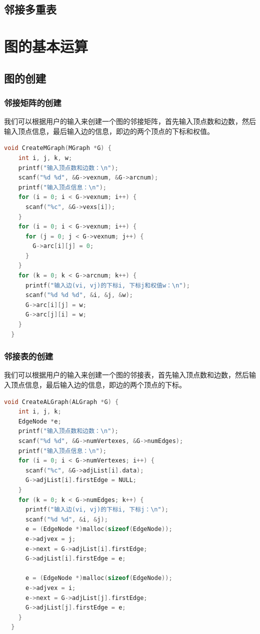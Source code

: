 \documentclass[lang=cn,newtx,10pt,scheme=chinese]{../elegantbook}
\begin{document}
\subsection{邻接多重表}

\section{图的基本运算}


\subsection{图的创建}

\subsubsection{邻接矩阵的创建}

我们可以根据用户的输入来创建一个图的邻接矩阵，首先输入顶点数和边数，然后输入顶点信息，最后输入边的信息，即边的两个顶点的下标和权值。

\begin{lstlisting}[language=C++, caption={邻接矩阵的创建}]
  void CreateMGraph(MGraph *G) {
    int i, j, k, w;
    printf("输入顶点数和边数：\n");
    scanf("%d %d", &G->vexnum, &G->arcnum);
    printf("输入顶点信息：\n");
    for (i = 0; i < G->vexnum; i++) {
      scanf("%c", &G->vexs[i]);
    }
    for (i = 0; i < G->vexnum; i++) {
      for (j = 0; j < G->vexnum; j++) {
        G->arc[i][j] = 0;
      }
    }
    for (k = 0; k < G->arcnum; k++) {
      printf("输入边(vi, vj)的下标i, 下标j和权值w：\n");
      scanf("%d %d %d", &i, &j, &w);
      G->arc[i][j] = w;
      G->arc[j][i] = w;
    }
  }
\end{lstlisting}

\subsubsection{邻接表的创建}

我们可以根据用户的输入来创建一个图的邻接表，首先输入顶点数和边数，然后输入顶点信息，最后输入边的信息，即边的两个顶点的下标。
\begin{lstlisting}[language=C++, caption={邻接表的创建}]
  void CreateALGraph(ALGraph *G) {
    int i, j, k;
    EdgeNode *e;
    printf("输入顶点数和边数：\n");
    scanf("%d %d", &G->numVertexes, &G->numEdges);
    printf("输入顶点信息：\n");
    for (i = 0; i < G->numVertexes; i++) {
      scanf("%c", &G->adjList[i].data);
      G->adjList[i].firstEdge = NULL;
    }
    for (k = 0; k < G->numEdges; k++) {
      printf("输入边(vi, vj)的下标i, 下标j：\n");
      scanf("%d %d", &i, &j);
      e = (EdgeNode *)malloc(sizeof(EdgeNode));
      e->adjvex = j;
      e->next = G->adjList[i].firstEdge;
      G->adjList[i].firstEdge = e;

      e = (EdgeNode *)malloc(sizeof(EdgeNode));
      e->adjvex = i;
      e->next = G->adjList[j].firstEdge;
      G->adjList[j].firstEdge = e;
    }
  }

\end{lstlisting}
\end{document}
